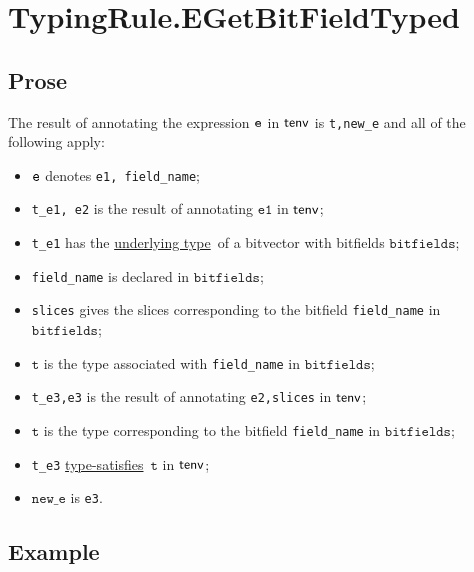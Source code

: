 \documentclass{book}
\newcommand\underlyingtype[0]{\hyperlink{def-underlyingtype}{underlying type}}
\newcommand\typesatisfies[0]{\hyperlink{def-typesatisfies}{type-satisfies}}
\newcommand\vt[0]{\texttt{t}}
\newcommand\veone[0]{\texttt{e1}}
\newcommand\bitfields[0]{\texttt{bitfields}}
\newcommand\newe[0]{\texttt{new\_e}}
\begin{document}

\section{TypingRule.EGetBitFieldTyped \label{sec:TypingRule.EGetBitFieldTyped}}

  \subsection{Prose}
  The result of annotating the expression $\texttt{e}$ in $\textsf{tenv}$ is
\texttt{t,new\_e} and all of the following apply:
  \begin{itemize}
  \item $\texttt{e}$ denotes \texttt{e1, field\_name};
  \item \texttt{t\_e1, e2} is the result of annotating $\veone$ in $\textsf{tenv}$;
  \item \texttt{t\_e1} has the \underlyingtype\ of a bitvector with bitfields $\bitfields$;
  \item \texttt{field\_name} is declared in $\bitfields$;
  \item \texttt{slices} gives the slices corresponding to the bitfield \texttt{field\_name} in \\
    $\bitfields$;
  \item $\vt$ is the type associated with \texttt{field\_name} in $\bitfields$;
  \item \texttt{t\_e3,e3} is the result of annotating \texttt{e2,slices} in $\textsf{tenv}$;
  \item $\vt$ is the type corresponding to the bitfield \texttt{field\_name} in $\bitfields$;
  \item \texttt{t\_e3} \typesatisfies\  $\vt$ in $\textsf{tenv}$;
  \item $\newe$ is \texttt{e3}.
  \end{itemize}

  \subsection{Example}


\end{document}
